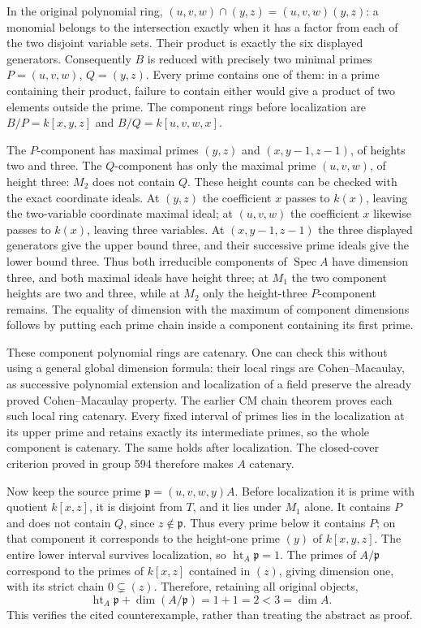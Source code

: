 In the original polynomial ring, \((u,v,w)\cap(y,z)=(u,v,w)(y,z)\): a monomial belongs to the intersection exactly when it has a factor from each of the two disjoint variable sets. Their product is exactly the six displayed generators. Consequently \(B\) is reduced with precisely two minimal primes \(P=(u,v,w)\), \(Q=(y,z)\). Every prime contains one of them: in a prime containing their product, failure to contain either would give a product of two elements outside the prime. The component rings before localization are \(B/P=k[x,y,z]\) and \(B/Q=k[u,v,w,x]\).

The \(P\)-component has maximal primes \((y,z)\) and \((x,y-1,z-1)\), of heights two and three. The \(Q\)-component has only the maximal prime \((u,v,w)\), of height three: \(M_2\) does not contain \(Q\). These height counts can be checked with the exact coordinate ideals. At \((y,z)\) the coefficient \(x\) passes to \(k(x)\), leaving the two-variable coordinate maximal ideal; at \((u,v,w)\) the coefficient \(x\) likewise passes to \(k(x)\), leaving three variables. At \((x,y-1,z-1)\) the three displayed generators give the upper bound three, and their successive prime ideals give the lower bound three. Thus both irreducible components of \(\operatorname{Spec}A\) have dimension three, and both maximal ideals have height three; at \(M_1\) the two component heights are two and three, while at \(M_2\) only the height-three \(P\)-component remains. The equality of dimension with the maximum of component dimensions follows by putting each prime chain inside a component containing its first prime.

These component polynomial rings are catenary. One can check this without using a general global dimension formula: their local rings are Cohen--Macaulay, as successive polynomial extension and localization of a field preserve the already proved Cohen--Macaulay property. The earlier CM chain theorem proves each such local ring catenary. Every fixed interval of primes lies in the localization at its upper prime and retains exactly its intermediate primes, so the whole component is catenary. The same holds after localization. The closed-cover criterion proved in group 594 therefore makes \(A\) catenary.

Now keep the source prime \(\mathfrak p=(u,v,w,y)A\). Before localization it is prime with quotient \(k[x,z]\), it is disjoint from \(T\), and it lies under \(M_1\) alone. It contains \(P\) and does not contain \(Q\), since \(z\notin\mathfrak p\). Thus every prime below it contains \(P\); on that component it corresponds to the height-one prime \((y)\) of \(k[x,y,z]\). The entire lower interval survives localization, so \(\operatorname{ht}_A\mathfrak p=1\). The primes of \(A/\mathfrak p\) correspond to the primes of \(k[x,z]\) contained in \((z)\), giving dimension one, with its strict chain \(0\subsetneq(z)\). Therefore, retaining all original objects, \[
 \operatorname{ht}_A\mathfrak p+\dim(A/\mathfrak p)=1+1=2<3=\dim A.
\] This verifies the cited counterexample, rather than treating the abstract as proof.

